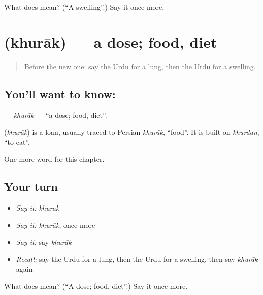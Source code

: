 \begin{tcolorbox}[breakable,colback=teal!4,colframe=teal!35!black,title={Before you move on}]
What does  mean? (\textquotedblleft{}A swelling\textquotedblright{}.) Say it once more.
\end{tcolorbox}
\section[\texorpdfstring{\ur{خوراک} (khurāk)}{خوراک (khurāk)}]{ (khurāk) — a dose; food, diet}

\label{lesson:UR-C187-khurak}



\begin{quote}
Before the new one: say the Urdu for a lung, then the Urdu for a swelling.
\end{quote}

\subsection*{You'll want to know: }
\textbf{} — \emph{khurāk} — \textquotedblleft{}a dose; food, diet\textquotedblright{}.

\begin{cousinweb}
\textbf{} (\emph{khurāk}) is a loan, usually traced to Persian \emph{khurāk}, \textquotedblleft{}food\textquotedblright{}. It is built on \emph{khurdan}, \textquotedblleft{}to eat\textquotedblright{}.
\end{cousinweb}

\begin{grammarlens}[title={What you've built}]
One more word for this chapter.
\end{grammarlens}

\subsection*{Your turn}
\begin{itemize}
\raggedright
  \item \emph{Say it:} \emph{khurāk}
  \item \emph{Say it:} \emph{khurāk}, once more
  \item \emph{Say it:} say \emph{khurāk}
  \item \emph{Recall:} say the Urdu for a lung, then the Urdu for a swelling, then say \emph{khurāk} again
\end{itemize}

\begin{tcolorbox}[breakable,colback=teal!4,colframe=teal!35!black,title={Before you move on}]
What does  mean? (\textquotedblleft{}A dose; food, diet\textquotedblright{}.) Say it once more.
\end{tcolorbox}
